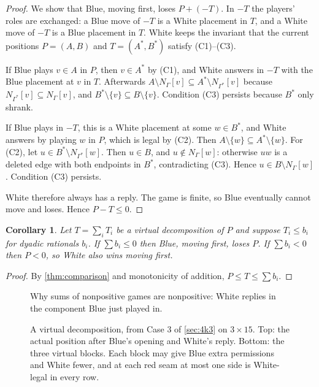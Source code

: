 \documentclass[11pt]{amsart}
\newtheorem{corollary}[theorem]{Corollary}
\theoremstyle{definition}
\newcommand{\Nb}{N}
\begin{document}
\begin{proof}
We show that Blue, moving first, loses $P+(-T)$. In $-T$ the players'
roles are exchanged: a Blue move of $-T$ is a White placement in $T$, and a
White move of $-T$ is a Blue placement in $T$. White keeps the invariant that
the current positions $P=(A,B)$ and $T=(A^*,B^*)$ satisfy (C1)--(C3).

If Blue plays $v\in A$ in $P$, then $v\in A^*$ by (C1), and White answers in
$-T$ with the Blue placement at $v$ in $T$. Afterwards
$A\setminus\Nb_\Gamma[v]\subseteq A^*\setminus\Nb_{\Gamma^*}[v]$ because
$\Nb_{\Gamma^*}[v]\subseteq\Nb_\Gamma[v]$, and
$B^*\setminus\{v\}\subseteq B\setminus\{v\}$. Condition (C3) persists because
$B^*$ only shrank.

If Blue plays in $-T$, this is a White placement at some $w\in B^*$, and
White answers by playing $w$ in $P$, which is legal by (C2). Then
$A\setminus\{w\}\subseteq A^*\setminus\{w\}$. For (C2), let
$u\in B^*\setminus\Nb_{\Gamma^*}[w]$. Then $u\in B$, and $u\notin\Nb_\Gamma[w]$:
otherwise $uw$ is a deleted edge with both endpoints in $B^*$, contradicting
(C3). Hence $u\in B\setminus\Nb_\Gamma[w]$. Condition (C3) persists.

White therefore always has a reply. The game is finite, so Blue eventually
cannot move and loses. Hence $P-T\le0$.
\end{proof}

\begin{corollary}\label{cor:bound}
Let $T=\sum_iT_i$ be a virtual decomposition of $P$ and suppose
$T_i\le b_i$ for dyadic rationals $b_i$. If $\sum b_i\le 0$ then Blue, moving
first, loses $P$. If $\sum b_i<0$ then $P<0$, so White also wins moving first.
\end{corollary}

\begin{proof}
By \cref{thm:comparison} and monotonicity of addition,
$P\le T\le\sum b_i$.
\end{proof}

\begin{figure}[ht]
\centering
{}
\caption{Why sums of nonpositive games are nonpositive: White replies in the
component Blue just played in.}
\label{fig:sum}
\end{figure}

\begin{figure}[ht]
\centering
{}
\caption{A virtual decomposition, from Case 3 of \cref{sec:4k3} on $3\times15$.
Top: the actual position after Blue's opening and White's reply. Bottom: the
three virtual blocks. Each block may give Blue extra permissions and White
fewer, and at each red seam at most one side is White-legal in every row.}
\label{fig:comparison}
\end{figure}
\end{document}
